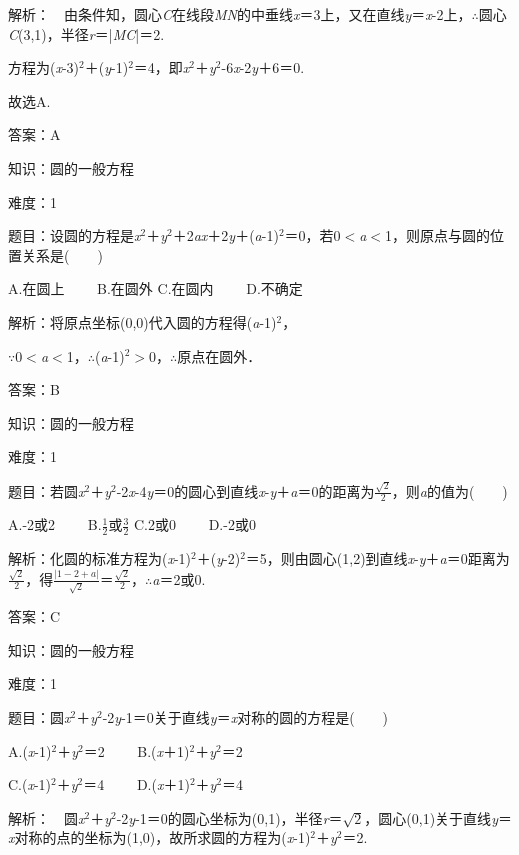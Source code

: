 \documentclass{article} %
\begin{document}
解析：　由条件知，圆心\textit{C}在线段\textit{MN}的中垂线\textit{x}＝3上，又在直线\textit{y}＝\textit{x}-2上，$\mathrm{\therefore}$圆心\textit{C}(3,1)，半径\textit{r}＝|\textit{MC}|＝2.

方程为(\textit{x}-3)${}^{2}$＋(\textit{y}-1)${}^{2}$＝4，即\textit{x}${}^{2}$＋\textit{y}${}^{2}$-6\textit{x}-2\textit{y}＋6＝0.

故选A.

答案：A

知识：圆的一般方程

难度：1

题目：设圆的方程是\textit{x}${}^{2}$＋\textit{y}${}^{2}$＋2\textit{ax}＋2\textit{y}＋(\textit{a}-1)${}^{2}$＝0，若0$\mathrm{<}$\textit{a}$\mathrm{<}$1，则原点与圆的位置关系是(　　)

A.在圆上　　 B.在圆外 C.在圆内　　 D.不确定

解析：将原点坐标(0,0)代入圆的方程得(\textit{a}-1)${}^{2}$，

$\mathrm{\because}$0$\mathrm{<}$\textit{a}$\mathrm{<}$1，$\mathrm{\therefore}$(\textit{a}-1)${}^{2}$$\mathrm{>}$0，$\mathrm{\therefore}$原点在圆外．

答案：B

知识：圆的一般方程

难度：1

题目：若圆\textit{x}${}^{2}$＋\textit{y}${}^{2}$-2\textit{x}-4\textit{y}＝0的圆心到直线\textit{x}-\textit{y}＋\textit{a}＝0的距离为$\frac{\sqrt{2}}{2}$，则\textit{a}的值为(　　)

A.-2或2　　 B.$\frac{1}{2}$或$\frac{3}{2}$  C.2或0　　 D.-2或0

解析：化圆的标准方程为(\textit{x}-1)${}^{2}$＋(\textit{y}-2)${}^{2}$＝5，则由圆心(1,2)到直线\textit{x}-\textit{y}＋\textit{a}＝0距离为$\frac{\sqrt{2}}{2}$，得$\frac{|1-2+a|}{\sqrt{2}}$＝$\frac{\sqrt{2}}{2}$，$\mathrm{\therefore}$\textit{a}＝2或0.

答案：C

知识：圆的一般方程

难度：1

题目：圆\textit{x}${}^{2}$＋\textit{y}${}^{2}$-2\textit{y}-1＝0关于直线\textit{y}＝\textit{x}对称的圆的方程是(　　)

A.(\textit{x}-1)${}^{2}$＋\textit{y}${}^{2}$＝2　　  B.(\textit{x}＋1)${}^{2}$＋\textit{y}${}^{2}$＝2 

C.(\textit{x}-1)${}^{2}$＋\textit{y}${}^{2}$＝4　　  D.(\textit{x}＋1)${}^{2}$＋\textit{y}${}^{2}$＝4

解析：　圆\textit{x}${}^{2}$＋\textit{y}${}^{2}$-2\textit{y}-1＝0的圆心坐标为(0,1)，半径\textit{r}＝$\sqrt{2}$，圆心(0,1)关于直线\textit{y}＝\textit{x}对称的点的坐标为(1,0)，故所求圆的方程为(\textit{x}-1)${}^{2}$＋\textit{y}${}^{2}$＝2.
\end{document}
